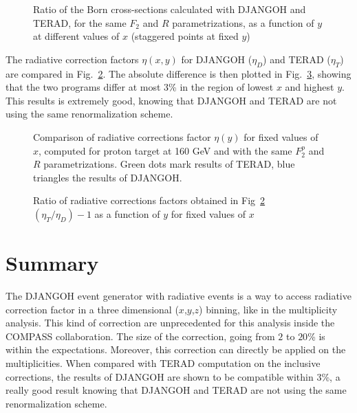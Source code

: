 \begin{figure}[!htb]
\centerline{}
\caption{Ratio of the Born cross-sections calculated with DJANGOH and TERAD, for the same $F_2$ and $R$ parametrizations, as a function of $y$ at different values of $x$ (staggered points at fixed $y$)}\label{fig:BRy}
\end{figure}

The radiative correction factors $\eta(x,y)$ for DJANGOH ($\eta_D$) and TERAD ($\eta_T$) are compared in Fig.~\ref{fig:RCy}. The absolute difference is then plotted in Fig.~\ref{fig:ERy}, showing that the two programs differ at most $3$\% in the region of lowest $x$ and highest $y$. This results is extremely good, knowing that DJANGOH and TERAD are not using the same renormalization scheme.


\begin{figure}[htb]
\centerline{}
\caption{Comparison of radiative corrections factor $\eta(y)$ for fixed values of $x$, computed for proton target at 160 GeV and with the same $F^p_2$ and $R$ parametrizations. Green dots mark results of TERAD, blue triangles the results of DJANGOH.}\label{fig:RCy}
\end{figure}

\begin{figure}[htb]
\centerline{}
\caption{Ratio of radiative corrections factors obtained in Fig~\ref{fig:RCy} $(\eta_T/\eta_D)-1$ as a function of $y$ for fixed values of $x$}\label{fig:ERy}
\end{figure}

\newpage


\section{Summary}

The DJANGOH event generator with radiative events is a way to access radiative correction factor in a three dimensional ($x$,$y$,$z$) binning, like in the multiplicity analysis. This kind of correction are unprecedented for this analysis inside the COMPASS collaboration. The size of the correction, going from $2$ to $20$\% is within the expectations. Moreover, this correction can directly be applied on the multiplicities. When compared with TERAD computation on the inclusive corrections, the results of DJANGOH are shown to be compatible within $3$\%, a really good result knowing that DJANGOH and TERAD are not using the same renormalization scheme.
